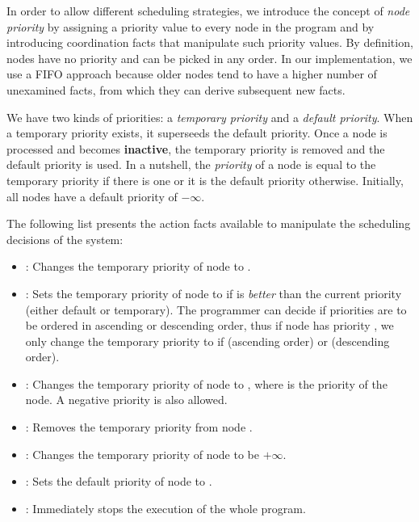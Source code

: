 
In order to allow different scheduling strategies, we introduce the concept of
\emph{node priority} by assigning a priority value to every node in the program
and by introducing coordination facts that manipulate such priority values.  By
definition, nodes have no priority and can be picked in any order. In our
implementation, we use a FIFO approach because older nodes tend to have a higher
number of unexamined facts, from which they can derive subsequent new facts.

We have two kinds of priorities: a \emph{temporary priority} and a \emph{default
priority}. When a temporary priority exists, it superseeds the default priority.
Once a node is processed and becomes \textbf{inactive}, the temporary priority
is removed and the default priority is used. In a nutshell, the \emph{priority}
of a node is equal to the temporary priority if there is one or it is the
default priority otherwise.  Initially, all nodes have a default priority of
$-\infty$.

The following list presents the action facts available to manipulate the
scheduling decisions of the system:

\begin{itemize}

   \item {}: Changes the temporary priority
      of node  to .

   \item {}: Sets the temporary priority of
      node  to  if  is \emph{better} than the current
      priority (either default or temporary). The programmer can decide if
      priorities are to be ordered in ascending or descending order, thus if
      node  has priority , we only change the temporary priority
      to  if  (ascending order) or  (descending
      order).

   \item {}: Changes the temporary priority
      of node  to , where  is the priority of the
      node. A negative priority is also allowed.

   \item {}: Removes the temporary priority from node
   .

   \item {}: Changes the temporary priority of node
    to be $+\infty$.

   \item {}: Sets the default
      priority of node  to .

   \item {}: Immediately stops the execution of the whole program.

\end{itemize}

